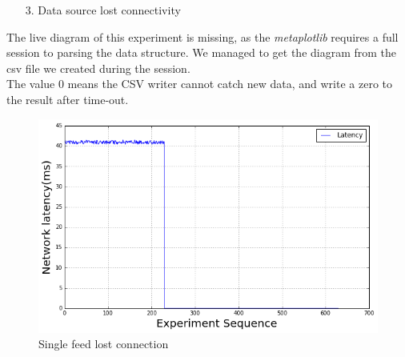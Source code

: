 \documentclass[11pt,openright,a4paper]{report}
\begin{document}
\begin{itemize}
	\item[3.] Data source lost connectivity
\end{itemize}
The live diagram of this experiment is missing, as the \textit{metaplotlib} requires a full session to parsing the data structure. We managed to get the diagram from the csv file we created during the session.\\
The value 0 means the CSV writer cannot catch new data, and write a zero to the result after time-out.
\begin{figure}
\centering
\includegraphics[width=0.7\linewidth]{picture/experiments/exp1/lostConnect}
\caption{Single feed lost connection}
\label{fig:lostConnect}
\end{figure}
\end{document}

